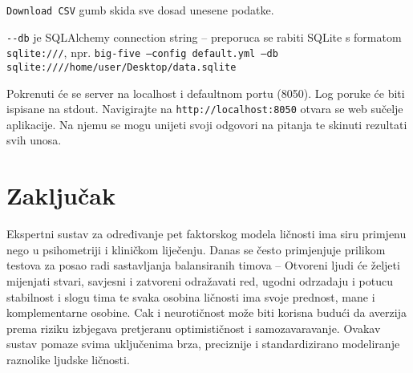 \documentclass[times, utf8, seminar]{fer}
\begin{document}
\verb|Download CSV| gumb skida sve dosad unesene podatke.

\verb|--db| je SQLAlchemy connection string -- preporuca se rabiti SQLite s formatom \texttt{sqlite:///}, npr. \texttt{big-five --config default.yml --db sqlite:////home/user/Desktop/data.sqlite}

Pokrenuti će se server na localhost i defaultnom portu (8050). Log poruke će biti ispisane na stdout. Navigirajte na \verb|http://localhost:8050| otvara se web sučelje aplikacije. Na njemu se mogu unijeti svoji odgovori na pitanja te skinuti rezultati svih unosa.

\chapter{Zaključak}

Ekspertni sustav za određivanje pet faktorskog modela ličnosti ima siru primjenu nego u psihometriji i kliničkom liječenju. Danas se često primjenjuje prilikom testova za posao radi sastavljanja balansiranih timova -- Otvoreni ljudi će željeti mijenjati stvari, savjesni i zatvoreni odražavati red, ugodni odrzadaju i potucu stabilnost i slogu tima te svaka osobina ličnosti ima svoje prednost, mane i komplementarne osobine. Cak i neurotičnost može biti korisna budući da averzija prema riziku izbjegava pretjeranu optimističnost i samozavaravanje.
Ovakav sustav pomaze svima uključenima brza, preciznije i standardizirano modeliranje raznolike ljudske ličnosti.



\end{document}

